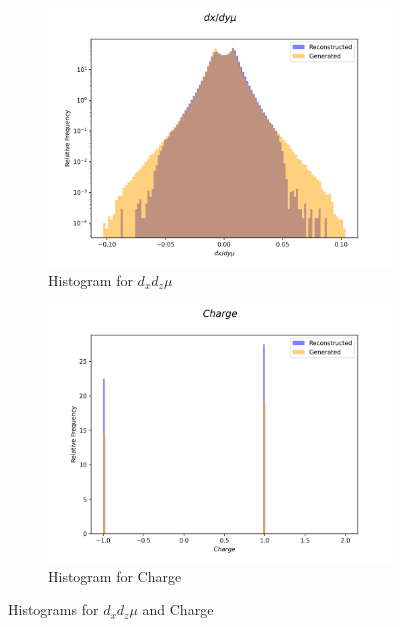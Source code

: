 \documentclass{article}
\begin{document}
\begin{figure}[H]
    \centering
    \begin{subfigure}[b]{0.45\textwidth}
        \includegraphics[width=\textwidth]{graphs/hadr_dx_dy_mu.png}
        \caption{Histogram for $d_xd_z \mu$}
        \label{fig:had_Angle_mu}
    \end{subfigure}
    \hfill
    \begin{subfigure}[b]{0.45\textwidth}
        \includegraphics[width=\textwidth]{graphs/hadr_Charge.png}
        \caption{Histogram for Charge}
        \label{fig:had_mom}
    \end{subfigure}
    \caption{Histograms for $d_xd_z \mu$ and Charge}
\end{figure}
\end{document}

